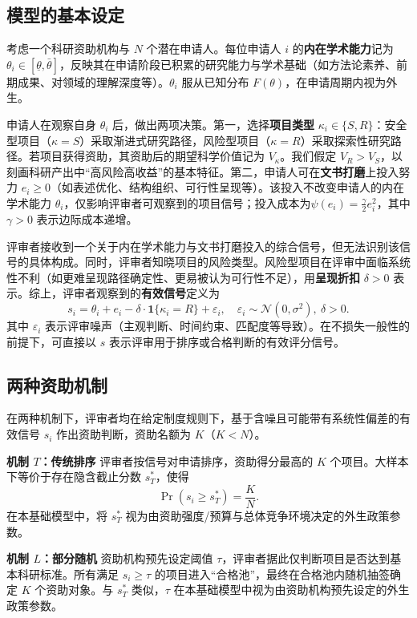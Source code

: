 \subsection{\textbf{模型的基本设定}}
考虑一个科研资助机构与 $N$ 个潜在申请人。每位申请人 $i$ 的\textbf{内在学术能力}记为 $\theta_i\in[\underline{\theta},\bar{\theta}]$，反映其在申请阶段已积累的研究能力与学术基础（如方法论素养、前期成果、对领域的理解深度等）。$\theta_i$ 服从已知分布 $F(\theta)$，在申请周期内视为外生。

申请人在观察自身 $\theta_i$ 后，做出两项决策。第一，选择\textbf{项目类型} $\kappa_i\in\{S,R\}$：安全型项目（$\kappa=S$）采取渐进式研究路径，风险型项目（$\kappa=R$）采取探索性研究路径。若项目获得资助，其资助后的期望科学价值记为 $V_\kappa$。我们假定 $V_R>V_S$，以刻画科研产出中“高风险高收益”的基本特征。第二，申请人可在\textbf{文书打磨}上投入努力 $e_i\ge 0$（如表述优化、结构组织、可行性呈现等）。该投入不改变申请人的内在学术能力 $\theta_i$，仅影响评审者可观察到的项目信号；投入成本为$\psi(e_i)=\frac{\gamma}{2}e_i^2$，其中 $\gamma>0$ 表示边际成本递增。

评审者接收到一个关于内在学术能力与文书打磨投入的综合信号，但无法识别该信号的具体构成。同时，评审者知晓项目的风险类型。风险型项目在评审中面临系统性不利（如更难呈现路径确定性、更易被认为可行性不足），用\textbf{呈现折扣} $\delta>0$ 表示。综上，评审者观察到的\textbf{有效信号}定义为
$$
    s_i=\theta_i+e_i-\delta\cdot\mathbf{1}\{\kappa_i=R\}+\varepsilon_i,\quad 
    \varepsilon_i\sim\mathcal{N}(0,\sigma^2),\ \delta>0 .
$$
其中 $\varepsilon_i$ 表示评审噪声（主观判断、时间约束、匹配度等导致）。在不损失一般性的前提下，可直接以 $s$ 表示评审用于排序或合格判断的有效评分信号。



\subsection{\textbf{两种资助机制}}
在两种机制下，评审者均在给定制度规则下，基于含噪且可能带有系统性偏差的有效信号 $s_i$ 作出资助判断，资助名额为 $K$（$K<N$）。

\textbf{机制 $T$：传统排序}\quad
评审者按信号对申请排序，资助得分最高的 $K$ 个项目。大样本下等价于存在隐含截止分数 $s_T^*$，使得
$$
    \Pr(s_i\ge s_T^*)=\frac{K}{N}.
$$
在本基础模型中，将 $s_T^*$ 视为由资助强度/预算与总体竞争环境决定的外生政策参数。

\textbf{机制 $L$：部分随机}\quad
资助机构预先设定阈值 $\tau$，评审者据此仅判断项目是否达到基本科研标准。所有满足 $s_i\ge\tau$ 的项目进入“合格池”，最终在合格池内随机抽签确定 $K$ 个资助对象。与 $s_T^*$ 类似，$\tau$ 在本基础模型中视为由资助机构预先设定的外生政策参数。

